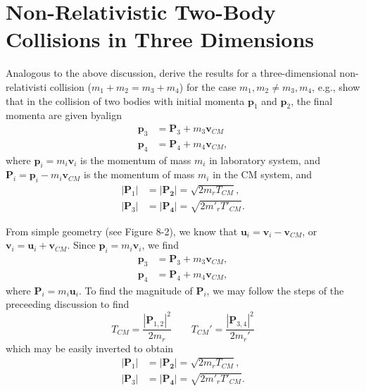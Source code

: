 \documentclass[../feynman-lectures-on-physics.tex]{subfiles}
\begin{document}
\section{Non-Relativistic Two-Body Collisions in Three Dimensions}

\begin{questions}

\question Analogous to the above discussion, derive the results for a
  three-dimensional non-relativisti collision ($m_1 + m_2 = m_3 + m_4$) for
  the case $m_1,m_2\neq{m_3},m_4$, e.g., show that in the collision of two
  bodies with initial momenta $\mathbf{p}_1$ and $\mathbf{p}_2$, the final
  momenta are given byalign
  \begin{align*}
    \mathbf{p}_3 &= \mathbf{P}_3 + m_3\mathbf{v}_{CM} \\
    \mathbf{p}_4 &= \mathbf{P}_4 + m_4\mathbf{v}_{CM},
  \end{align*}
  where $\mathbf{p}_i = m_i\mathbf{v}_i$ is the momentum of mass $m_i$ in
  laboratory system, and $\mathbf{P}_i=\mathbf{p}_i-m_i\mathbf{v}_{CM}$ is the
  momentum of mass $m_i$ in the CM system, and
  \begin{align*}
    |\mathbf{P}_1| &= |\mathbf{P_2}| = \sqrt{2m_rT_{CM}}, \\
    |\mathbf{P}_3| &= |\mathbf{P_4}| = \sqrt{2m'_rT'_{CM}}.
  \end{align*}

  \begin{solution}
    From simple geometry (see Figure 8-2), we know that $\mathbf{u}_i =
    \mathbf{v}_i-\mathbf{v}_{CM}$, or $\mathbf{v}_i =
    \mathbf{u}_i+\mathbf{v}_{CM}$. Since $\mathbf{p}_i=m_i\mathbf{v}_i$, we find
    \begin{align*}
      \mathbf{p}_3 &= \mathbf{P}_3 + m_3\mathbf{v}_{CM},\\
      \mathbf{p}_4 &= \mathbf{P}_4 + m_4\mathbf{v}_{CM},
    \end{align*}
    where $\mathbf{P}_i=m_i\mathbf{u}_i$. To find the magnitude of
    $\mathbf{P}_i$, we may follow the steps of the preceeding discussion to find
    \[
      T_{CM} = \frac{|\mathbf{P}_{1,2}|^2}{2m_r} \qquad T_{CM}' = \frac{|\mathbf{P}_{3,4}|^2}{2m_r'}
    \]
    which may be easily inverted to obtain
    \begin{align*}
      |\mathbf{P}_1| &= |\mathbf{P_2}| = \sqrt{2m_rT_{CM}}, \\
      |\mathbf{P}_3| &= |\mathbf{P_4}| = \sqrt{2m'_rT'_{CM}}.
    \end{align*}
  \end{solution}


\end{questions}
\end{document}
